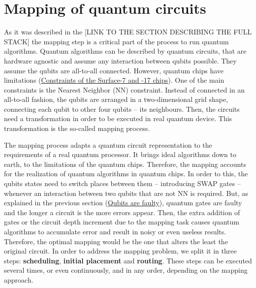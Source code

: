 \section*{Mapping of quantum circuits}
\label{sec:org8ee5b7b}
As it was described in the [LINK TO THE SECTION DESCRIBING THE FULL STACK] the mapping step is a critical part of the process to run quantum algorithms.
Quantum algorithms can be described by quantum circuits, that are hardware agnostic and assume any interaction between qubits possible.
They assume the qubits are all-to-all connected.
However, quantum chips have limitations (\href{chapter-3.org}{Constraints of the Surface-7 and -17 chips}).
One of the main constraints is the Nearest Neighbor (NN) constraint.
Instead of connected in an all-to-all fashion, the qubits are arranged in a two-dimensional grid shape, connecting each qubit to other four qubits -- its neighbours.
Then, the circuits need a transformation in order to be executed in real quantum device.
This transformation is the so-called mapping process.

The mapping process adapts a quantum circuit representation to the requirements of a real quantum processor.
It brings ideal algorithms down to earth, to the limitations of the quantum chips.
Therefore, the mapping accounts for the realization of quantum algorithms in quantum chips.
In order to this, the qubits states need to switch places between them -- introducing SWAP gates -- whenever an interaction between two qubits that are not NN is required. 
But, as explained in the previous section (\hyperref[sec:org8acc695]{Qubits are faulty}), quantum gates are faulty and the longer a circuit is the more errors appear.
Then, the extra addition of gates or the circuit depth increment due to the mapping task causes quantum algorithms to accumulate error and result in noisy or even useless results.
Therefore, the optimal mapping would be the one that alters the least the original circuit.
In order to address the mapping problem, we split it in three steps: \textbf{scheduling}, \textbf{initial placement} and \textbf{routing}.
These steps can be executed several times, or even continuously, and in any order, depending on the mapping approach.

